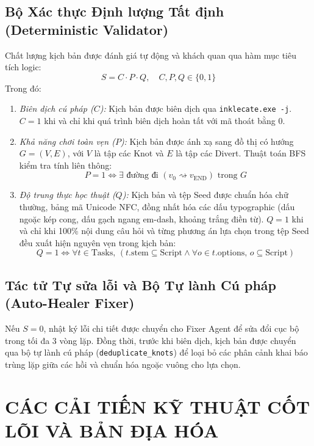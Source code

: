 \documentclass[conference]{IEEEtran}
\begin{document}
\subsection{Bộ Xác thực Định lượng Tất định (Deterministic Validator)}
Chất lượng kịch bản được đánh giá tự động và khách quan qua hàm mục tiêu tích logic:
\begin{equation}
S = C \cdot P \cdot Q, \quad C, P, Q \in \{0, 1\}
\end{equation}
Trong đó:
\begin{enumerate}
    \item \textit{Biên dịch cú pháp ($C$):} Kịch bản được biên dịch qua \texttt{inklecate.exe -j}. $C = 1$ khi và chỉ khi quá trình biên dịch hoàn tất với mã thoát bằng 0.
    \item \textit{Khả năng chơi toàn vẹn ($P$):} Kịch bản được ánh xạ sang đồ thị có hướng $G = (V, E)$, với $V$ là tập các Knot và $E$ là tập các Divert. Thuật toán BFS kiểm tra tính liên thông:
    \begin{equation}
    P = 1 \iff \exists \text{ đường đi } (v_0 \rightsquigarrow v_{\text{END}}) \text{ trong } G
    \end{equation}
    \item \textit{Độ trung thực học thuật ($Q$):} Kịch bản và tệp Seed được chuẩn hóa chữ thường, bảng mã Unicode NFC, đồng nhất hóa các dấu typographic (dấu ngoặc kép cong, dấu gạch ngang em-dash, khoảng trắng điền từ). $Q = 1$ khi và chỉ khi 100\% nội dung câu hỏi và từng phương án lựa chọn trong tệp Seed đều xuất hiện nguyên vẹn trong kịch bản:
    \begin{equation}
    Q = 1 \iff \forall t \in \text{Tasks}, \, (t.\text{stem} \subseteq \text{Script} \wedge \forall o \in t.\text{options}, \, o \subseteq \text{Script})
    \end{equation}
\end{enumerate}

\subsection{Tác tử Tự sửa lỗi và Bộ Tự lành Cú pháp (Auto-Healer Fixer)}
Nếu $S = 0$, nhật ký lỗi chi tiết được chuyển cho Fixer Agent để sửa đổi cục bộ trong tối đa 3 vòng lặp. Đồng thời, trước khi biên dịch, kịch bản được chuyển qua bộ tự lành cú pháp (\texttt{deduplicate\_knots}) để loại bỏ các phân cảnh khai báo trùng lặp giữa các hồi và chuẩn hóa ngoặc vuông cho lựa chọn.

\section{CÁC CẢI TIẾN KỸ THUẬT CỐT LÕI VÀ BẢN ĐỊA HÓA}
\end{document}
